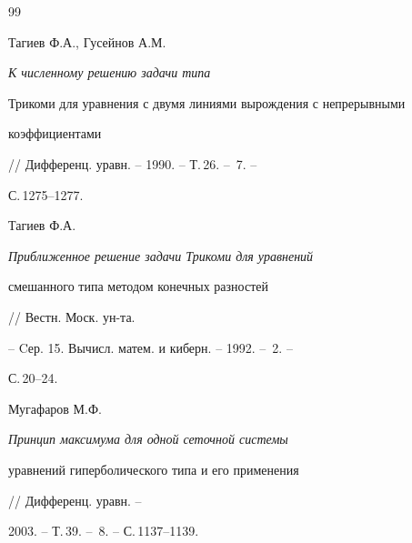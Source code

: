 \begin{thebibliography}{99}


Тагиев Ф.А., Гусейнов А.М. {\em К численному решению задачи типа


Трикоми для уравнения с двумя линиями вырождения с непрерывными


коэффициентами} // Дифференц. уравн. -- 1990. -- Т.\,26. -- \No\,7. --


С.\,1275--1277.







Тагиев Ф.А. {\em Приближенное решение задачи Трикоми для уравнений


смешанного типа методом конечных разностей} // Вестн. Моск. ун-та.


-- Cер. 15. Вычисл. матем. и киберн. -- 1992. -- \No\,2. --


С.\,20--24.







Мугафаров М.Ф. {\em Принцип максимума для одной сеточной системы


уравнений гиперболического типа и его применения} // Дифференц. уравн. --


2003. -- Т.\,39. -- \No\,8. -- С.\,1137--1139.





\end{thebibliography}





\vskip 2cm









\smallskip









\label{end}





